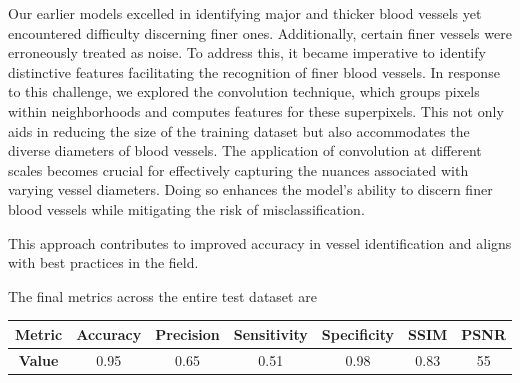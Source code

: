 \documentclass{article}
\begin{document}
Our earlier models excelled in identifying major and thicker blood vessels yet encountered difficulty discerning finer ones. Additionally, certain finer vessels were erroneously treated as noise. To address this, it became imperative to identify distinctive features facilitating the recognition of finer blood vessels.
In response to this challenge, we explored the convolution technique, which groups pixels within neighborhoods and computes features for these superpixels. This not only aids in reducing the size of the training dataset but also accommodates the diverse diameters of blood vessels.
The application of convolution at different scales becomes crucial for effectively capturing the nuances associated with varying vessel diameters. Doing so enhances the model's ability to discern finer blood vessels while mitigating the risk of misclassification.

This approach contributes to improved accuracy in vessel identification and aligns with best practices in the field.

The final metrics across the entire test dataset are

\begin{tabular}{|c|c|c|c|c|c|c|}
  \hline
  \textbf{Metric} & Accuracy & Precision & Sensitivity & Specificity & SSIM & PSNR \\
  \hline
  \textbf{Value} & 0.95 & 0.65 & 0.51 & 0.98 & 0.83 & 55 \\
  \hline
\end{tabular}
\end{document}
